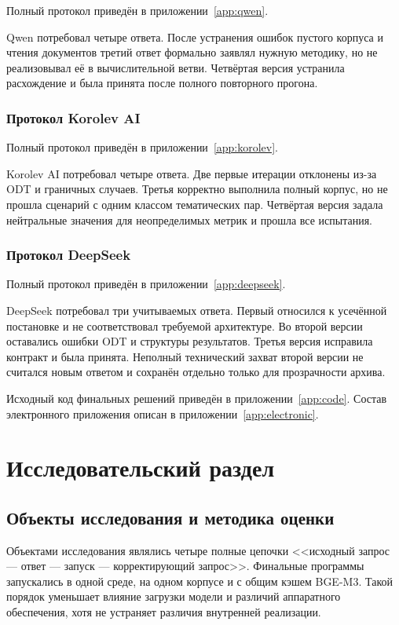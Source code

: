 \documentclass[a4paper,12pt]{extreport}
\begin{document}
Полный протокол приведён в приложении~\ref{app:qwen}.

Qwen потребовал четыре ответа. После устранения ошибок пустого корпуса и чтения документов третий ответ формально заявлял нужную методику, но не реализовывал её в вычислительной ветви. Четвёртая версия устранила расхождение и была принята после полного повторного прогона.

\subsection{Протокол Korolev AI}

Полный протокол приведён в приложении~\ref{app:korolev}.

Korolev AI потребовал четыре ответа. Две первые итерации отклонены из-за ODT и граничных случаев. Третья корректно выполнила полный корпус, но не прошла сценарий с одним классом тематических пар. Четвёртая версия задала нейтральные значения для неопределимых метрик и прошла все испытания.

\subsection{Протокол DeepSeek}

Полный протокол приведён в приложении~\ref{app:deepseek}.

DeepSeek потребовал три учитываемых ответа. Первый относился к усечённой постановке и не соответствовал требуемой архитектуре. Во второй версии оставались ошибки ODT и структуры результатов. Третья версия исправила контракт и была принята. Неполный технический захват второй версии не считался новым ответом и сохранён отдельно только для прозрачности архива.

Исходный код финальных решений приведён в приложении~\ref{app:code}. Состав электронного приложения описан в приложении~\ref{app:electronic}.

\chapter{Исследовательский раздел}

\section{Объекты исследования и методика оценки}

Объектами исследования являлись четыре полные цепочки <<исходный запрос --- ответ --- запуск --- корректирующий запрос>>. Финальные программы запускались в одной среде, на одном корпусе и с общим кэшем BGE-M3. Такой порядок уменьшает влияние загрузки модели и различий аппаратного обеспечения, хотя не устраняет различия внутренней реализации.
\end{document}
